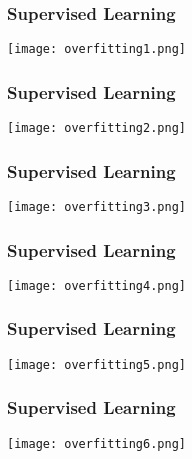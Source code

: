 \documentclass[t]{beamer}
\begin{document}
\begin{frame}
  \frametitle{Supervised Learning}
   \begin{center}
    \texttt{[image: overfitting1.png]}
   \end{center}
\end{frame}

\begin{frame}
  \frametitle{Supervised Learning}
   \begin{center}
    \texttt{[image: overfitting2.png]}
   \end{center}
\end{frame}

\begin{frame}
  \frametitle{Supervised Learning}
   \begin{center}
    \texttt{[image: overfitting3.png]}
   \end{center}
\end{frame}

\begin{frame}
  \frametitle{Supervised Learning}
   \begin{center}
    \texttt{[image: overfitting4.png]}
   \end{center}
\end{frame}

\begin{frame}
  \frametitle{Supervised Learning}
   \begin{center}
    \texttt{[image: overfitting5.png]}
   \end{center}
\end{frame}

\begin{frame}
  \frametitle{Supervised Learning}
   \begin{center}
    \texttt{[image: overfitting6.png]}
   \end{center}
 \end{frame}
\end{document}
